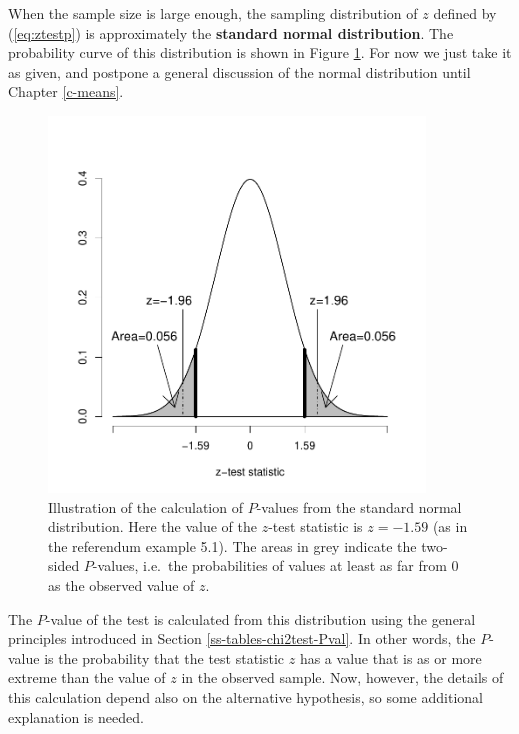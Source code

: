 \documentclass[11pt,a4paper,openany]{book}
\begin{document}
When the sample size is large enough, the sampling distribution of \(z\)
defined by (\ref{eq:ztestp}) is approximately the \textbf{standard
normal distribution}. The probability curve of this distribution is
shown in Figure \ref{fig:f-pval-prob}. For now we just take it as given,
and postpone a general discussion of the normal distribution until
Chapter \ref{c-means}.

\begin{figure}[htbp]
\centering
\includegraphics[width=10.00000cm]{pval_zp.pdf}
\caption{\label{fig:f-pval-prob} Illustration of the calculation of
\(P\)-values from the standard normal distribution. Here the value of
the \(z\)-test statistic is \(z=-1.59\) (as in the referendum example
5.1). The areas in grey indicate the two-sided \(P\)-values, i.e.~the
probabilities of values at least as far from 0 as the observed value of
\(z\).}
\end{figure}

The \(P\)-value of the test is calculated from this distribution using
the general principles introduced in Section
\ref{ss-tables-chi2test-Pval}. In other words, the \(P\)-value is the
probability that the test statistic \(z\) has a value that is as or more
extreme than the value of \(z\) in the observed sample. Now, however,
the details of this calculation depend also on the alternative
hypothesis, so some additional explanation is needed.
\end{document}
